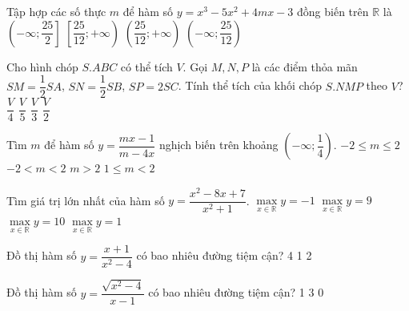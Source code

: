 \begin{ex}%
Tập hợp các số thực $m$ để hàm số $y = x^3 - 5x^2 + 4mx - 3$ đồng biến trên $\mathbb{R}$ là
\choice
{$\left( - \infty; \dfrac{25}{2}\right]$}
{\True $\left[\dfrac{25}{12}; + \infty\right)$}
{$\left(\dfrac{25}{12}; + \infty\right)$}
{$\left( - \infty; \dfrac{25}{12}\right)$}
\end{ex}
\begin{ex}%
Cho hình chóp $S. ABC$ có thể tích $V$. Gọi $M, N, P$ là các điểm thỏa mãn $ SM = \dfrac{1}{2}SA$, $SN = \dfrac{1}{2}SB$, $SP = 2SC$. Tính thể tích của khối chóp $S. NMP$ theo $V$? 
\choice
{$\dfrac{V}{4}$}
{$\dfrac{V}{5}$}
{$\dfrac{V}{3}$}
{\True $\dfrac{V}{2}$}
\end{ex}
\begin{ex}%
Tìm $m$ để hàm số $y = \dfrac{mx - 1}{m - 4x}$ nghịch biến trên khoảng $\left( - \infty; \dfrac{1}{4}\right)$.
\choice
{$ - 2\le m\le 2$}
{$ - 2 < m < 2$}
{$m > 2$}
{\True $1\le m < 2$}
\end{ex}
\begin{ex}%
Tìm giá trị lớn nhất của hàm số $y = \dfrac{x^2 - 8x + 7}{x^2 + 1}$.
\choice
{$\underset{x\in \mathbb{R}}{\mathop{\max}}y = - 1$} 
{\True $\underset{x\in \mathbb{R}}{\mathop{\max}}y = 9$ }
{$\underset{x\in \mathbb{R}}{\mathop{\max}}y = 10$}
{$\underset{x\in \mathbb{R}}{\mathop{\max}}y = 1$}
\end{ex}
\begin{ex}%
Đồ thị hàm số $y = \dfrac{x + 1}{x^2 - 4}$ có bao nhiêu đường tiệm cận?
\choice
{4}
{1}
{}
{2}
\end{ex}
\begin{ex}%
Đồ thị hàm số $y = \dfrac{\sqrt{x^2 - 4}}{x - 1}$ có bao nhiêu đường tiệm cận?
\choice
{1}
{}
{3}
{0}
\end{ex}
